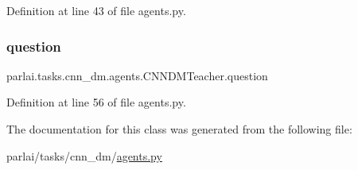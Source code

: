 Definition at line 43 of file agents.\+py.

\mbox{\label{classparlai_1_1tasks_1_1cnn__dm_1_1agents_1_1CNNDMTeacher_adabc9a81947bb5e85f132fc7676958e6}} 
\subsubsection{\texorpdfstring{question}{question}}
{\footnotesize\ttfamily parlai.\+tasks.\+cnn\+\_\+dm.\+agents.\+C\+N\+N\+D\+M\+Teacher.\+question}



Definition at line 56 of file agents.\+py.



The documentation for this class was generated from the following file\+:\begin{DoxyCompactItemize}
\item 
parlai/tasks/cnn\+\_\+dm/\hyperlink{parlai_2tasks_2cnn__dm_2agents_8py}{agents.\+py}\end{DoxyCompactItemize}

